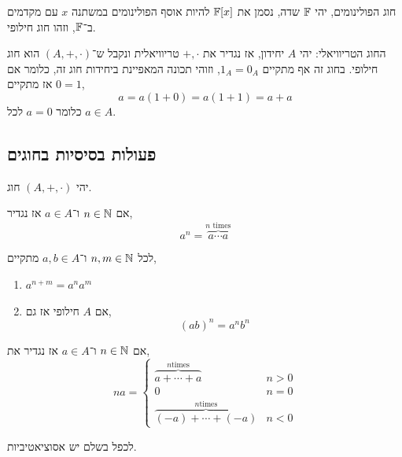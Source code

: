 \begin{example}
	חוג הפולינומים,
	יהי $\mathbb{F}$ שדה, נסמן את $\mathbb{F}[x]$ להיות אוסף הפולינומים במשתנה $x$ עם מקדמים ב־$\mathbb{F}$, וזהו חוג חילופי.
\end{example}
\begin{example}
	החוג הטריוויאלי:
	יהי $A$ יחידון, אז נגדיר את $+, \cdot$ טריוויאלית ונקבל ש־$(A, +, \cdot)$ הוא חוג חילופי.
	בחוג זה אף מתקיים $1_A = 0_A$, וזוהי תכונה המאפיינת ביחידות חוג זה, כלומר אם $0 = 1$ אז מתקיים,
	\[
		a
		= a (1 + 0)
		= a ( 1 + 1)
		= a + a
	\]
	כלומר $a = 0$ לכל $a \in A$.
\end{example}

\subsection{פעולות בסיסיות בחוגים}
יהי $(A, +, \cdot)$ חוג.
\begin{definition}[חזקה]
	אם $n \in \mathbb{N}$ ו־$a \in A$ אז נגדיר,
	\[
		a^n
		= \overbrace{a \cdots a}^{n \text{ times}}
	\]
\end{definition}
\begin{proposition}
	לכל $n, m \in \mathbb{N}$ ו־$a, b \in A$ מתקיים,
	\begin{enumerate}
		\item $a^{n + m} = a^n a^m$
		\item אם $A$ חילופי אז גם,
			\[
				{(a b)}^n = a^n b^n
			\]
	\end{enumerate}
\end{proposition}
\begin{definition}
	אם $n \in \mathbb{N}$ ו־$a \in A$ אז נגדיר את,
	\[
		n a
		= \begin{cases}
			\overbrace{a + \cdots + a}^{n \text{times}} & n > 0 \\
			0 & n = 0 \\
			\overbrace{(-a) + \cdots + (-a)}^{n \text{times}} & n < 0
		\end{cases}
	\]
\end{definition}
לכפל בשלם יש אסוציאטיביות.

